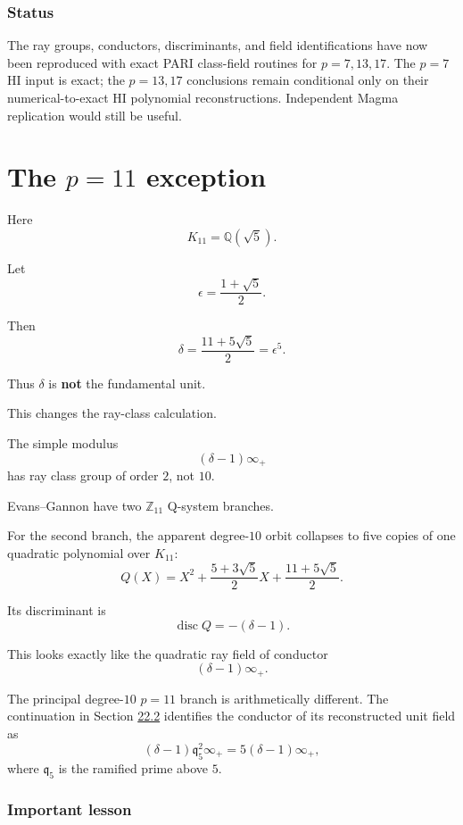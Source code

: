 \documentclass[11pt,reqno]{amsart}
\theoremstyle{plain}
\begin{document}
\subsubsection*{Status}

The ray groups, conductors, discriminants, and field identifications have now been reproduced with exact PARI class-field routines for \(p=7,13,17\). The \(p=7\) HI input is exact; the \(p=13,17\) conclusions remain conditional only on their numerical-to-exact HI polynomial reconstructions. Independent Magma replication would still be useful.

\section{\texorpdfstring{The \(p=11\) exception}{The p=11 exception}}\label{sec:9}

Here
\[
K_{11}
=
\mathbb Q(\sqrt5).
\]

Let
\[
\epsilon=\frac{1+\sqrt5}{2}.
\]

Then
\[
\delta
=
\frac{11+5\sqrt5}{2}
=
\epsilon^5.
\]

Thus \(\delta\) is \textbf{not} the fundamental unit.

This changes the ray-class calculation.

The simple modulus
\[
(\delta-1)\infty_+
\]
has ray class group of order \(2\), not \(10\).

Evans--Gannon have two \(\mathbb Z_{11}\) Q-system branches.

For the second branch, the apparent degree-\(10\) orbit collapses to five copies of one quadratic polynomial over \(K_{11}\):
\[
Q(X)
=
X^2
+
\frac{5+3\sqrt5}{2}X
+
\frac{11+5\sqrt5}{2}.
\]

Its discriminant is
\[
\operatorname{disc}Q
=
-(\delta-1).
\]

This looks exactly like the quadratic ray field of conductor
\[
(\delta-1)\infty_+.
\]

The principal degree-\(10\) \(p=11\) branch is arithmetically different. The continuation in Section \hyperref[sec:22.2]{22.2} identifies the conductor of its reconstructed unit field as
\[
(\delta-1)\mathfrak q_5^2\infty_+
=5(\delta-1)\infty_+,
\]
where \(\mathfrak q_5\) is the ramified prime above \(5\).

\subsubsection*{Important lesson}
\end{document}
